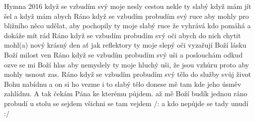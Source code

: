 \begin{TEXT}{Hymna 2016}
\SLOKA {} když se vzbudím  svý \NL
{} moje  nesly  cestou \NL
{} nekle ty  slabý \NL
{} když mám jít šel a když  mám abych  
\SLOKA Ráno když se vzbudím probudím svý ruce\NL
aby mohly pro bližního něco udělat,\NL
aby pochopily ty moje slabý ruce\NL
že vyhrává kdo pomáhá a dokáže mít rád 
\SLOKA Ráno když se vzbudím probudím svý oči\NL
abych do nich chytit mohl(a) nový krásný den\NL
ať jak reflektory ty moje slepý oči\NL
vyzařují Boží lásku Boží milost ven
\SLOKA Ráno když se vzbudím probudím svý uši \NL
a poslouchám odkud ozve se mi Boží hlas\NL
aby nemyslely ty moje hluchý uši, \NL
že jsou vzhůru proto aby mohly usnout zas.
\SLOKA Ráno když se vzbudím probudím svý tělo\NL
do služby svůj život Bohu nabídnu \NL
a on si ho vezme i to slabý tělo\NL
donese mě tam kde jeho úsměv zahlídnu.
\SLOKA A tak čekám Pána ke kterému půjdem.\NL
až mě Boží budík jednou ráno probudí\NL
u stolu se sejdem všichni se tam vejdem\NL
/: a kdo nepůjde se tady unudí :/
\end{TEXT}
